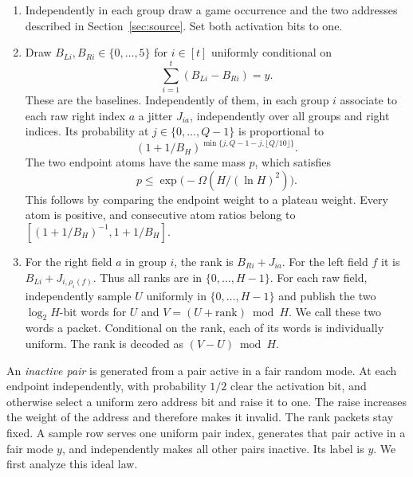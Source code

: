 \documentclass[11pt]{article}
\begin{document}
\begin{enumerate}
\item Independently in each group draw a game occurrence and the two
addresses described in Section~\ref{sec:source}. Set both activation bits
to one.
\item Draw $B_{Li},B_{Ri}\in\{0,\ldots,5\}$ for $i\in[t]$ uniformly
conditional on
\begin{equation}\label{eq:baseline}
  \sum_{i=1}^t(B_{Li}-B_{Ri})=y.
\end{equation}
These are the baselines. Independently of them, in each group $i$
associate to each raw right index $a$ a jitter $J_{ia}$, independently
over all groups and right indices. Its probability at $j\in\{0,\ldots,Q-1\}$
is proportional to
\[
    (1+1/B_H)^{\min\{j,Q-1-j,\lfloor Q/10\rfloor\}}.
\]
The two endpoint atoms have the same mass $p$, which satisfies
\begin{equation}\label{eq:taper}
  p\le \exp\big(-\Omega(H/(\ln H)^2)\big).
\end{equation}
This follows by comparing the endpoint weight to a plateau weight.
Every atom is positive, and consecutive atom ratios belong to
$[(1+1/B_H)^{-1},1+1/B_H]$.
\item For the right field $a$ in group $i$, the rank is $B_{Ri}+J_{ia}$.
For the left field $f$ it is $B_{Li}+J_{i,\rho_i(f)}$. Thus all ranks are
in $\{0,\ldots,H-1\}$. For each raw field, independently sample
$U$ uniformly in $\{0,\ldots,H-1\}$ and publish the two $\log_2 H$-bit
words for $U$ and $V=(U+\mathrm{rank})\bmod H$. We call these two words
a packet. Conditional on the rank, each of its words is individually
uniform. The rank is decoded as $(V-U)\bmod H$.
\end{enumerate}

An \emph{inactive pair} is generated from a pair active in a fair random
mode. At each endpoint independently, with probability $1/2$ clear the
activation bit, and otherwise select a uniform zero address bit and
raise it to one. The raise increases the weight of the address and
therefore makes it invalid. The rank packets stay fixed. A sample row
serves one uniform pair index, generates that pair active in a fair
mode $y$, and independently makes all other pairs inactive. Its label
is $y$. We first analyze this ideal law.
\end{document}

